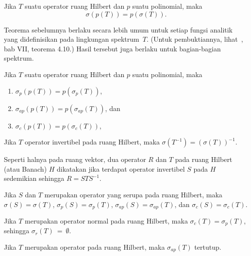 \begin{thm}\label{SMThm} Jika $T$ suatu operator ruang Hilbert dan $p$ suatu polinomial, maka
   \[ \sigma(p(T)) = p(\sigma(T)). \]
\end{thm}

Teorema sebelumnya berlaku secara lebih umum untuk setiap fungsi analitik yang didefinisikan pada lingkungan spektrum~$T$.
(Untuk pembuktiannya, lihat~\cite{Conway:1990}, bab VII, teorema 4.10.) Hasil tersebut juga berlaku untuk bagian-bagian spektrum.

\begin{prop} Jika $T$ suatu operator ruang Hilbert dan $p$ suatu polinomial, maka
   \begin{enumerate}[label=\rm{(\alph*)}]
     \item $\sigma_p(p(T)) = p(\sigma_p(T))$,
     \item $\sigma_{ap}(p(T)) = p(\sigma_{ap}(T))$, dan
     \item $\sigma_c(p(T)) = p(\sigma_c(T))$,
   \end{enumerate}
\end{prop}

\begin{prop}
    Jika $T$ operator invertibel pada ruang Hilbert, maka $\sigma(T^{-1}) = (\sigma(T))^{-1}$.
\end{prop}

\begin{defn}\label{defn_similar_Hsp_ops} Seperti halnya pada ruang vektor, dua operator $R$ dan $T$ pada ruang Hilbert (atau Banach) $H$ dikatakan
 jika terdapat operator invertibel $S$ pada $H$ sedemikian sehingga $R = STS^{-1}$.
\end{defn}

\begin{prop} Jika $S$ dan $T$ merupakan operator yang serupa pada ruang Hilbert, maka $\sigma(S) = \sigma(T)$, $\sigma_p(S) = \sigma_p(T)$,
$\sigma_{ap}(S) = \sigma_{ap}(T)$, dan $\sigma_c(S) = \sigma_c(T)$.
\end{prop}

\begin{prop} Jika $T$ merupakan operator normal pada ruang Hilbert, maka $\sigma_c(T) = \sigma_p(T)$, sehingga $\sigma_r(T)~=~\emptyset$.
\end{prop}

\begin{prop} Jika $T$ merupakan operator pada ruang Hilbert, maka $\sigma_{ap}(T)$ tertutup.
\end{prop}

